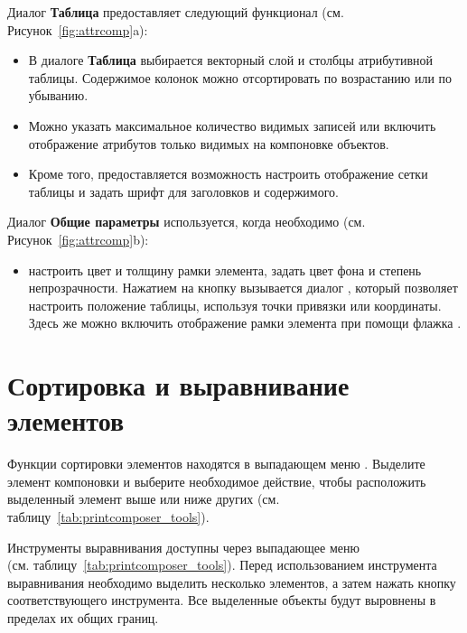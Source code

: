 
Диалог \textbf{Таблица} предоставляет следующий функционал
(см. Рисунок~\ref{fig:attrcomp}a):

\begin{itemize}[label=--]
\item В диалоге \textbf{Таблица} выбирается векторный слой и столбцы
атрибутивной таблицы. Содержимое колонок можно отсортировать по возрастанию
или по убыванию.
\item Можно указать максимальное количество видимых записей или включить
отображение атрибутов только видимых на компоновке объектов.
\item Кроме того, предоставляется возможность настроить отображение сетки
таблицы и задать шрифт для заголовков и содержимого.
\end{itemize}


Диалог \textbf{Общие параметры} используется, когда необходимо
(см. Рисунок~\ref{fig:attrcomp}b):

\begin{itemize}[label=--]
\item настроить цвет и толщину рамки элемента, задать
цвет фона и степень непрозрачности. Нажатием на кнопку 
вызывается диалог , который позволяет
настроить положение таблицы, используя точки привязки или координаты.
Здесь же можно включить отображение рамки элемента при помощи флажка
.
\end{itemize}

\section{Сортировка и выравнивание элементов}

Функции сортировки элементов находятся в выпадающем меню
. Выделите
элемент компоновки и выберите необходимое действие, чтобы расположить
выделенный элемент выше или ниже других (см. таблицу~\ref{tab:printcomposer_tools}).

Инструменты выравнивания доступны через выпадающее меню \\
(см. таблицу~\ref{tab:printcomposer_tools}). Перед использованием
инструмента выравнивания необходимо выделить несколько элементов, а
затем нажать кнопку соответствующего инструмента. Все выделенные объекты
будут выровнены в пределах их общих границ.

